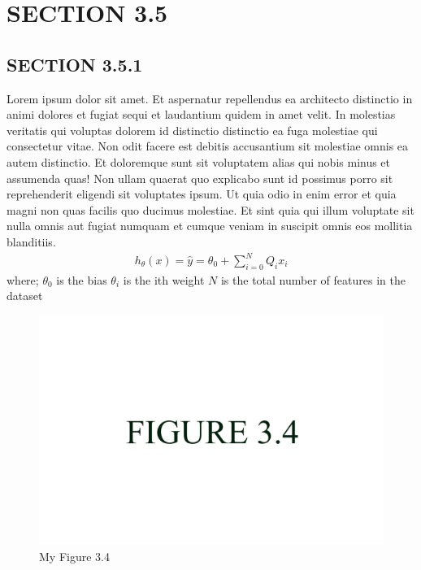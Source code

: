 \documentclass[a4paper,12pt]{report}
\begin{document}
\section{SECTION 3.5}

\subsection{SECTION 3.5.1}

\hspace{.5cm} Lorem ipsum dolor sit amet. Et aspernatur repellendus ea architecto distinctio in animi dolores et fugiat sequi et laudantium quidem in amet velit. In molestias veritatis qui voluptas dolorem id distinctio distinctio ea fuga molestiae qui consectetur vitae. Non odit facere est debitis accusantium sit molestiae omnis ea autem distinctio. Et doloremque sunt sit voluptatem alias qui nobis minus et assumenda quas! Non ullam quaerat quo explicabo sunt id possimus porro sit reprehenderit eligendi sit voluptates ipsum. Ut quia odio in enim error et quia magni non quas facilis quo ducimus molestiae. Et sint quia qui illum voluptate sit nulla omnis aut fugiat numquam et cumque veniam in suscipit omnis eos mollitia blanditiis. 
  \begin{equation}
\begin{split}
h_\theta(x)=\hat{y}=\theta_0+\sum_{i=0}^{N} Q_ix_i
 \end{split}
\end{equation}
where; \hfill \break
$\theta_0$ is the bias\hfill \break
$\theta_i$ is the ith weight\hfill \break
$N$ is the total number of features in the dataset

\begin{figure}[h]
  \centering
  \includegraphics[width=12cm]{fig_3.4.jpg}
  \caption{My Figure 3.4}
\end{figure}
\end{document}
